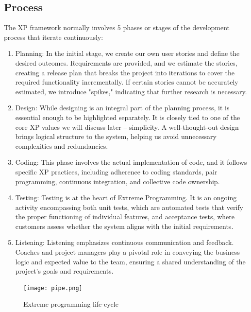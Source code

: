 \documentclass[12pt]{article}
\begin{document}
\subsection{Process}
The XP framework normally involves 5 phases or stages of the development process that iterate continuously:
\begin{enumerate}
    \item Planning: In the initial stage, we create our own user stories and define the desired outcomes. Requirements are provided, and we estimate the stories, creating a release plan that breaks the project into iterations to cover the required functionality incrementally. If certain stories cannot be accurately estimated, we introduce "spikes," indicating that further research is necessary.
    \item Design: While designing is an integral part of the planning process, it is essential enough to be highlighted separately. It is closely tied to one of the core XP values we will discuss later – simplicity. A well-thought-out design brings logical structure to the system, helping us avoid unnecessary complexities and redundancies.
    \item Coding: This phase involves the actual implementation of code, and it follows specific XP practices, including adherence to coding standards, pair programming, continuous integration, and collective code ownership.
    \item Testing: Testing is at the heart of Extreme Programming. It is an ongoing activity encompassing both unit tests, which are automated tests that verify the proper functioning of individual features, and acceptance tests, where customers assess whether the system aligns with the initial requirements.
    \item Listening: Listening emphasizes continuous communication and feedback. Coaches and project managers play a pivotal role in conveying the business logic and expected value to the team, ensuring a shared understanding of the project's goals and requirements.
\end{enumerate}

\begin{figure}[H]
    \centering
    \texttt{[image: pipe.png]}
    \caption{Extreme programming life-cycle}
    \label{fig:XP}
\end{figure}
\end{document}
